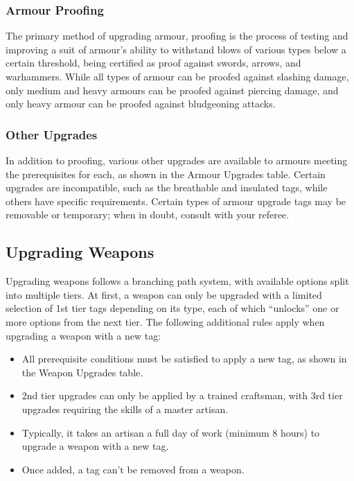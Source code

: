 \documentclass{book}
\providecommand{\tightlist}{%
\setlength{\itemsep}{0pt}\setlength{\parskip}{0pt}}
\begin{document}
\subsubsection*{Armour Proofing}\label{armour-proofing}

The primary method of upgrading armour, proofing is the process of
testing and improving a suit of armour's ability to withstand blows of
various types below a certain threshold, being certified as proof
against swords, arrows, and warhammers. While all types of armour can be
proofed against slashing damage, only medium and heavy armours can be
proofed against piercing damage, and only heavy armour can be proofed
against bludgeoning attacks.

\subsubsection*{Other Upgrades}\label{other-upgrades}

In addition to proofing, various other upgrades are available to armours
meeting the prerequisites for each, as shown in the Armour Upgrades
table. Certain upgrades are incompatible, such as the breathable and
insulated tags, while others have specific requirements. Certain types
of armour upgrade tags may be removable or temporary; when in doubt,
consult with your referee.

\subsection*{Upgrading Weapons}\label{upgrading-weapons}

Upgrading weapons follows a branching path system, with available
options split into multiple tiers. At first, a weapon can only be
upgraded with a limited selection of 1st tier tags depending on its
type, each of which ``unlocks'' one or more options from the next tier.
The following additional rules apply when upgrading a weapon with a new
tag:

\begin{itemize}
	\tightlist
	\item
	All prerequisite conditions must be satisfied to apply a new tag, as
	shown in the Weapon Upgrades table.
	\item
	2nd tier upgrades can only be applied by a trained craftsman, with 3rd
	tier upgrades requiring the skills of a master artisan.
	\item
	Typically, it takes an artisan a full day of work (minimum 8 hours) to
	upgrade a weapon with a new tag.
	\item
	Once added, a tag can't be removed from a weapon.
\end{itemize}
\end{document}
